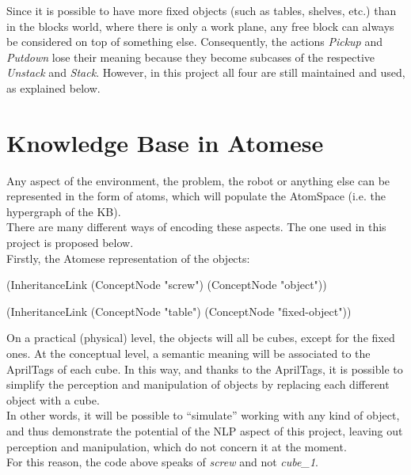 Since it is possible to have more fixed objects (such as tables, shelves, etc.) than in the blocks world, where there is only a work plane, any free block can always be considered on top of something else. Consequently, the actions \textit{Pickup} and \textit{Putdown} lose their meaning because they become subcases of the respective \textit{Unstack} and \textit{Stack}. However, in this project all four are still maintained and used, as explained below. 


\section{Knowledge Base in Atomese}\label{sec:env_atomese}

Any aspect of the environment, the problem, the robot or anything else can be represented in the form of atoms, which will populate the AtomSpace (i.e. the hypergraph of the KB). \\
There are many different ways of encoding these aspects. The one used in this project is proposed below. \\

Firstly, the Atomese representation of the objects: \\
\begin{python}
	(InheritanceLink
		(ConceptNode "screw")
		(ConceptNode "object"))

	(InheritanceLink
		(ConceptNode "table")
		(ConceptNode "fixed-object"))
\end{python}
On a practical (physical) level, the objects will all be cubes, except for the fixed ones. At the conceptual level, a semantic meaning will be associated to the AprilTags of each cube. In this way, and thanks to the AprilTags, it is possible to simplify the perception and manipulation of objects by replacing each different object with a cube. \\
In other words, it will be possible to \enquote{simulate} working with any kind of object, and thus demonstrate the potential of the NLP aspect of this project, leaving out perception and manipulation, which do not concern it at the moment. \\
For this reason, the code above speaks of \textit{screw} and not \textit{cube\_1}. \\

